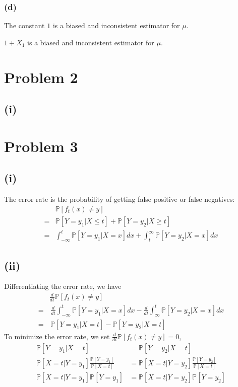 \documentclass[twoside,11pt]{homework}
\begin{document}
\subsubsection*{(d)}
	\begin{claim}
		The constant $1$ is a biased and inconsistent estimator for $\mu$.
	\end{claim}
	\begin{claim}
		$1+X_1$ is a biased and inconsistent estimator for $\mu$.
	\end{claim}
	
\section*{Problem 2} 
\subsection*{(i)}

\section*{Problem 3} 
\subsection*{(i)}
	The error rate is the probability of getting false positive or false negatives:
	\begin{align*}
		& \mathbb{P}[f_t(x)\neq y] \\
		=& \mathbb{P}[Y=y_1 | X\leq t] + \mathbb{P}[Y=y_2 | X\geq t] \\
		=& \int_{-\infty}^t  \mathbb{P}[Y=y_1 | X=x] dx + \int_{t}^\infty  \mathbb{P}[Y=y_2 | X=x] dx
	\end{align*}
\subsection*{(ii)}
	Differentiating the error rate, we have
	\begin{align*}
		& \frac{d}{dt} \mathbb{P}[f_t(x)\neq y]  \\
		=& \, \frac{d}{dt}\int_{-\infty}^t  \mathbb{P}[Y=y_1 | X=x] dx - \frac{d}{dt} \int_{\infty}^t  \mathbb{P}[Y=y_2 | X=x] dx \\
		=&\,  \mathbb{P}[Y=y_1 | X=t] - \mathbb{P}[Y=y_2 | X=t] \tag{Foundamental Theorem of Calculus}
	\end{align*}
	To minimize the error rate, we set $\frac{d}{dt} \mathbb{P}[f_t(x)\neq y] = 0$,
	\begin{align*}
		\mathbb{P}[Y=y_1 | X=t] &= \mathbb{P}[Y=y_2 | X=t] \\
		\mathbb{P}[ X=t | Y=y_1 ] \frac{ \mathbb{P}[ Y=y_1 ]}{ \mathbb{P}[ X=t]}
		&= \mathbb{P}[ X=t | Y=y_2 ] \frac{ \mathbb{P}[ Y=y_2 ]}{ \mathbb{P}[ X=t]} \tag{Bayes Rule}\\
		\mathbb{P}[ X=t | Y=y_1 ] \mathbb{P}[ Y=y_1 ] 
		&= \mathbb{P}[ X=t | Y=y_2 ] \mathbb{P}[ Y=y_2 ]
	\end{align*}
\end{document}
